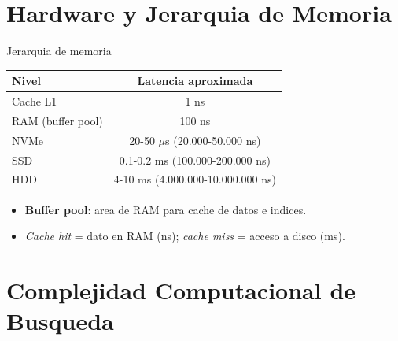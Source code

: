\documentclass[aspectratio=169, 10pt, xcolor=table]{beamer}
\begin{document}
\section{Hardware y Jerarquia de Memoria}

\begin{frame}{Jerarquia de memoria}
    \begin{table}
        \centering
        \begin{tabular}{l|c}
            \toprule
            Nivel & Latencia aproximada \\
            \midrule
            Cache L1 & 1 ns \\
            RAM (buffer pool) & 100 ns \\
            NVMe & 20-50 $\mu$s (20.000-50.000 ns) \\
            SSD & 0.1-0.2 ms (100.000-200.000 ns) \\
            HDD & 4-10 ms (4.000.000-10.000.000 ns) \\
            \bottomrule
        \end{tabular}
    \end{table}
    \begin{itemize}
        \item \textbf{Buffer pool}: area de RAM para cache de datos e indices.
        \item \textit{Cache hit} = dato en RAM (ns); \textit{cache miss} = acceso a disco (ms).
    \end{itemize}
\end{frame}

\section{Complejidad Computacional de Busqueda}
\end{document}
